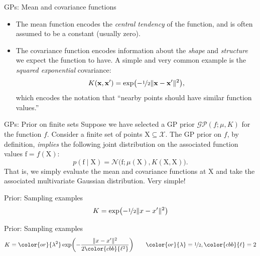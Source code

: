 \documentclass[xcolor={dvipsnames},hyperref={breaklinks=true},12pt]{beamer}
\newcommand{\given}{\mid}
\newcommand{\mc}[1]{\mathcal{#1}}
\newcommand{\mat}[1]{\bm{\mathrm{#1}}}
\renewcommand{\vec}[1]{\bm{\mathrm{#1}}}
\newcommand{\emphr}[1]{{\textcolor{or}{\itshape #1}}}
\newcommand{\maker}[1]{{\color{or}{#1}}}
\newcommand{\makeb}[1]{{\color{cbb}{#1}}}
\begin{document}
\begin{frame}{GPs: Mean and covariance functions}
  \begin{itemize}
    \item The mean function encodes the \emphr{central tendency} of
      the function, and is often assumed to be a constant (usually
      zero).
    \item The covariance function encodes information about the
      \emphr{shape} and \emphr{structure} we expect the function to
      have.  A simple and very common example is the \emphr{squared
        exponential} covariance:
      \begin{equation*}
        K(\vec{x}, \vec{x}')
        =
        \exp\bigl(-\nicefrac{1}{2}\lVert \vec{x} - \vec{x}' \rVert^2\bigr),
      \end{equation*}
      which encodes the notation that ``nearby points should have
      similar function values.''
  \end{itemize}
\end{frame}

\begin{frame}{GPs: Prior on finite sets}
  Suppose we have selected a GP prior $\mc{GP}(f; \mu, K)$ for the
  function $f$.  Consider a finite set of points $\mat{X} \subseteq
  \mc{X}$.  The GP prior on $f$, by definition, \emphr{implies} the
  following joint distribution on the associated function values
  $\vec{f} = f(\mat{X})$:
  \begin{equation*}
    p(\vec{f} \given \mat{X})
    =
    \mc{N}(\vec{f}; \mu(\mat{X}), K(\mat{X}, \mat{X})\bigr).
  \end{equation*}
  That is, we simply evaluate the mean and covariance functions at $\mat{X}$
  and take the associated multivariate Gaussian distribution.  Very simple!
\end{frame}

\begin{frame}{Prior: Sampling examples}
  \hspace*{-1.5em}
  \begin{equation*}
    K = \exp\bigl(-\nicefrac{1}{2}\lVert x - x' \rVert^2\bigr)
  \end{equation*}
\end{frame}

\begin{frame}{Prior: Sampling examples}
  \hspace*{-1.5em}
  \begin{equation*}
    K = \maker{\lambda^2}\exp\biggl(-\frac{\lVert x - x' \rVert^2}{2\makeb{\ell^2}}\biggr)
    \qquad
    \maker{\lambda} = \nicefrac{1}{2}, \makeb{\ell} = 2
  \end{equation*}
\end{frame}
\end{document}
